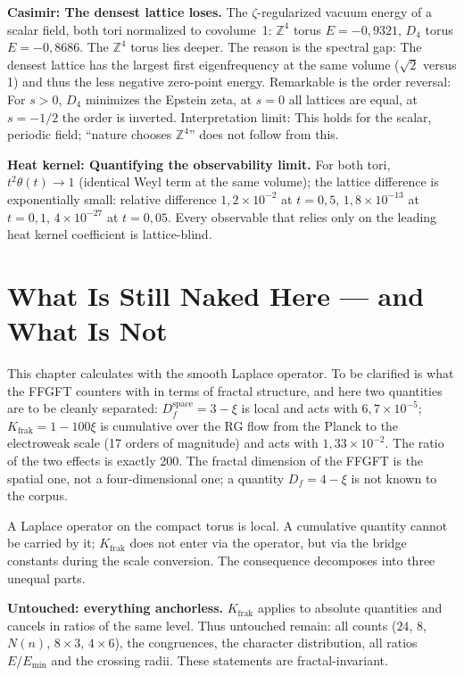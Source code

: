 \textbf{Casimir: The densest lattice loses.} The
$\zeta$-regularized vacuum energy of a scalar field, both tori
normalized to covolume~1: $\mathbb{Z}^4$ torus $E = -0{,}9321$,
$D_4$ torus $E = -0{,}8686$. The $\mathbb{Z}^4$ torus lies deeper. The
reason is the spectral gap: The densest lattice has the
largest first eigenfrequency at the same volume ($\sqrt2$ versus 1) and thus the
less negative zero-point energy. Remarkable is the order reversal:
For $s>0$, $D_4$ minimizes the Epstein zeta, at $s = 0$ all lattices are equal, at $s = -1/2$ the order is inverted. Interpretation limit:
This holds for the scalar, periodic field; \enquote{nature chooses
$\mathbb{Z}^4$} does not follow from this.

\textbf{Heat kernel: Quantifying the observability limit.} For both tori,
$t^2\theta(t)\to1$ (identical Weyl term at the same volume); the
lattice difference is exponentially small: relative difference
$1{,}2\times10^{-2}$ at $t = 0{,}5$, $1{,}8\times10^{-13}$ at
$t = 0{,}1$, $4\times10^{-27}$ at $t = 0{,}05$. Every observable that relies only
on the leading heat kernel coefficient is lattice-blind.

\section{What Is Still Naked Here --- and What Is Not}

This chapter calculates with the smooth Laplace operator. To be clarified is
what the FFGFT counters with in terms of fractal structure, and here two
quantities are to be cleanly separated: $D_f^{\mathrm{space}} = 3-\xi$ is local and
acts with $6{,}7\times10^{-5}$; $K_{\mathrm{frak}} = 1-100\xi$ is
cumulative over the RG flow from the Planck to the electroweak scale
(17 orders of magnitude) and acts with $1{,}33\times10^{-2}$. The
ratio of the two effects is exactly 200. The fractal dimension of the
FFGFT is the spatial one, not a four-dimensional one; a quantity
$D_f = 4-\xi$ is not known to the corpus.

A Laplace operator on the compact torus is local. A cumulative
quantity cannot be carried by it; $K_{\mathrm{frak}}$ does not enter via the
operator, but via the bridge constants during the
scale conversion. The consequence decomposes into three unequal parts.

\textbf{Untouched: everything anchorless.} $K_{\mathrm{frak}}$ applies to
absolute quantities and cancels in ratios of the same level. Thus
untouched remain: all counts ($24$, $8$, $N(n)$, $8\times3$,
$4\times6$), the congruences, the character distribution, all ratios
$E/E_{\min}$ and the crossing radii. These statements are
fractal-invariant.

